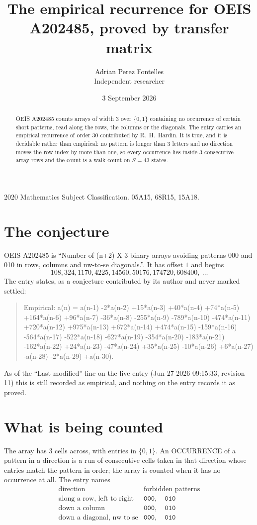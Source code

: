 \documentclass[11pt,a4paper]{article}
\title{The empirical recurrence for OEIS A202485, proved by transfer matrix}
\author{Adrian Perez Fontelles\\ \small Independent researcher}
\date{3 September 2026}
\theoremstyle{plain}
\theoremstyle{definition}
\begin{document}
\maketitle

\begin{abstract}
OEIS A202485 counts arrays of width $3$ over $\{0,1\}$ containing no occurrence of certain short
patterns, read along the rows, the columns or the diagonals. The entry carries an empirical
recurrence of order $30$ contributed by R.~H.~Hardin. It is true, and it is decidable
rather than empirical: no pattern is longer than $3$ letters and no direction moves the row
index by more than one, so every occurrence lies inside $3$ consecutive array rows and the
count is a walk count on $S=43$ states.
\end{abstract}

\noindent\small 2020 Mathematics Subject Classification. 05A15, 68R15, 15A18.\normalsize

\section{The conjecture}

OEIS A202485 is ``Number of (n+2) X 3 binary arrays avoiding patterns 000 and 010 in rows, columns and nw-to-se diagonals.''. It has offset $1$ and begins
\[
108, 324, 1170, 4225, 14560, 50176, 174720, 608400,\ \dots
\]
The entry states, as a conjecture contributed by its author and never marked settled:
\begin{quote}
Empirical: a(n) = a(n-1) -2*a(n-2) +15*a(n-3) +40*a(n-4) +74*a(n-5) +164*a(n-6) +96*a(n-7) -36*a(n-8) -255*a(n-9) -789*a(n-10) -474*a(n-11) +720*a(n-12) +975*a(n-13) +672*a(n-14) +474*a(n-15) -159*a(n-16) -564*a(n-17) -522*a(n-18) -627*a(n-19) -354*a(n-20) -183*a(n-21) -162*a(n-22) +24*a(n-23) -47*a(n-24) +35*a(n-25) -10*a(n-26) +6*a(n-27) -a(n-28) -2*a(n-29) +a(n-30).
\end{quote}
As of the ``Last modified'' line on the live entry (Jun 27 2026 09:15:33, revision 11) this is still
recorded as empirical, and nothing on the entry records it as proved.

\section{What is being counted}

The array has $3$ cells across, with entries in $\{0,1\}$. An OCCURRENCE of a pattern in a
direction is a run of consecutive cells taken in that direction whose entries match the pattern
in order; the array is counted when it has no occurrence at all. The entry names
\[
\begin{array}{ll}
\text{direction} & \text{forbidden patterns} \\[2pt]
\text{along a row, left to right} & \mathtt{000},\quad \mathtt{010} \\
\text{down a column} & \mathtt{000},\quad \mathtt{010} \\
\text{down a diagonal, nw to se} & \mathtt{000},\quad \mathtt{010} \\
\end{array}
\]
\end{document}
